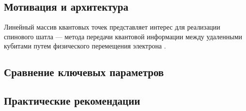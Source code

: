 \documentclass[a4paper,14pt]{extreport} %
\begin{document}
\subsection{Мотивация и архитектура}

Линейный массив квантовых точек представляет интерес для реализации спинового шатла — 
метода передачи квантовой информации между удаленными кубитами путем физического 
перемещения электрона \cite{shutling}.


\subsection{Сравнение ключевых параметров}


\subsection{Практические рекомендации}


    
    
    
\end{document}
